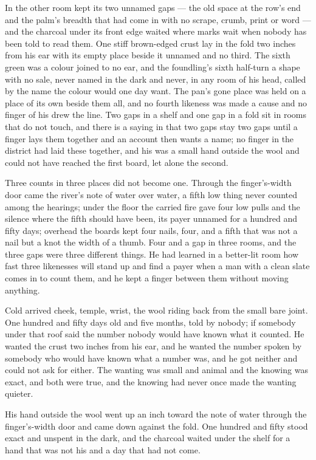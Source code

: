In the other room  kept its two unnamed gaps --- the old space at the row's end and the palm's breadth that had come in with no scrape, crumb, print or word --- and the charcoal under its front edge waited where marks wait when nobody has been told to read them. One stiff brown-edged crust lay in the fold two inches from his ear with its empty place beside it unnamed and no third. The sixth green was a colour joined to no ear, and the foundling's sixth half-turn a shape with no sale, never named in the dark and never, in any room of his head, called by the name the colour would one day want. The pan's gone place was held on a place of its own beside them all, and no fourth likeness was made a cause and no finger of his drew the line. Two gaps in a shelf and one gap in a fold sit in rooms that do not touch, and there is a saying in  that two gaps stay two gaps until a finger lays them together and an account then wants a name; no finger in the district had laid these together, and his was a small hand outside the wool and could not have reached the first board, let alone the second.

Three counts in three places did not become one. Through the finger's-width door came the river's note of water over water, a fifth low thing never counted among the hearings; under the floor the carried fire gave four low pulls and the silence where the fifth should have been, its payer unnamed for a hundred and fifty days; overhead the boards kept four nails, four, and a fifth that was not a nail but a knot the width of a thumb. Four and a gap in three rooms, and the three gaps were three different things. He had learned in a better-lit room how fast three likenesses will stand up and find a payer when a man with a clean slate comes in to count them, and he kept a finger between them without moving anything.

Cold arrived cheek, temple, wrist, the wool riding back from the small bare joint. One hundred and fifty days old and five months, told by nobody; if somebody under that roof said the number nobody would have known what it counted. He wanted the crust two inches from his ear, and he wanted the number spoken by somebody who would have known what a number was, and he got neither and could not ask for either. The wanting was small and animal and the knowing was exact, and both were true, and the knowing had never once made the wanting quieter.

His hand outside the wool went up an inch toward the note of water through the finger's-width door and came down against the fold. One hundred and fifty stood exact and unspent in the dark, and the charcoal waited under the shelf for a hand that was not his and a day that had not come.
